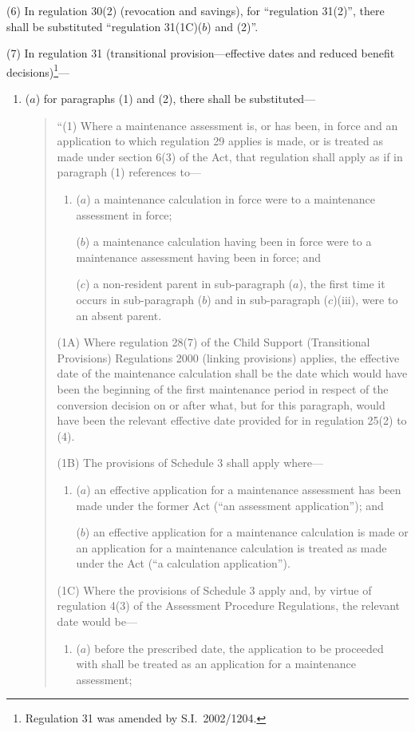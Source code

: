 \documentclass[12pt,a4paper]{article}
\begin{document}
(6) In regulation 30(2) (revocation and savings), for “regulation 31(2)”, there shall be substituted “regulation 31(1C)($b$)  and (2)”.

(7) In regulation 31 (transitional provision—effective dates and reduced benefit decisions)\footnote{Regulation 31 was amended by S.I.\ 2002/1204.}—
\begin{enumerate}\item[]
($a$) for paragraphs (1) and (2), there shall be substituted—
\begin{quotation}
“(1) Where a maintenance assessment is, or has been, in force and an application to which regulation 29 applies is made, or is treated as made under section 6(3) of the Act, that regulation shall apply as if in paragraph (1) references to—
\begin{enumerate}\item[]
($a$) a maintenance calculation in force were to a maintenance assessment in force;

($b$) a maintenance calculation having been in force were to a maintenance assessment having been in force; and

($c$) a non-resident parent in sub-paragraph ($a$), the first time it occurs in sub-paragraph ($b$)  and in sub-paragraph ($c$)(iii), were to an absent parent.
\end{enumerate}

(1A) Where regulation 28(7) of the Child Support (Transitional Provisions) Regulations 2000 (linking provisions) applies, the effective date of the maintenance calculation shall be the date which would have been the beginning of the first maintenance period in respect of the conversion decision on or after what, but for this paragraph, would have been the relevant effective date provided for in regulation 25(2) to (4).

(1B) The provisions of Schedule 3 shall apply where—
\begin{enumerate}\item[]
($a$) an effective application for a maintenance assessment has been made under the former Act (“an assessment application”); and

($b$) an effective application for a maintenance calculation is made or an application for a maintenance calculation is treated as made under the Act (“a calculation application”).
\end{enumerate}

(1C) Where the provisions of Schedule 3 apply and, by virtue of regulation 4(3) of the Assessment Procedure Regulations, the relevant date would be—
\begin{enumerate}\item[]
($a$) before the prescribed date, the application to be proceeded with shall be treated as an application for a maintenance assessment;


\end{enumerate}
\end{quotation}
\end{enumerate}
\end{document}
